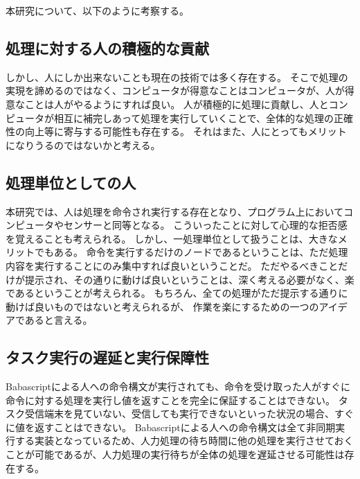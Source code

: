 \documentclass[twoside]{wiss}
\begin{document}
本研究について、以下のように考察する。

\subsection{処理に対する人の積極的な貢献}



しかし、人にしか出来ないことも現在の技術では多く存在する。
そこで処理の実現を諦めるのではなく、コンピュータが得意なことはコンピュータが、人が得意なことは人がやるようにすれば良い。
人が積極的に処理に貢献し、人とコンピュータが相互に補完しあって処理を実行していくことで、全体的な処理の正確性の向上等に寄与する可能性も存在する。
それはまた、人にとってもメリットになりうるのではないかと考える。

\subsection{処理単位としての人}

本研究では、人は処理を命令され実行する存在となり、プログラム上においてコンピュータやセンサーと同等となる。
こういったことに対して心理的な拒否感を覚えることも考えられる。
しかし、一処理単位として扱うことは、大きなメリットでもある。
命令を実行するだけのノードであるということは、ただ処理内容を実行することにのみ集中すれば良いということだ。
ただやるべきことだけが提示され、その通りに動けば良いということは、深く考える必要がなく、楽であるということが考えられる。
もちろん、全ての処理がただ提示する通りに動けば良いものではないと考えられるが、
作業を楽にするための一つのアイデアであると言える。

\subsection{タスク実行の遅延と実行保障性}

Babascriptによる人への命令構文が実行されても、命令を受け取った人がすぐに命令に対する処理を実行し値を返すことを完全に保証することはできない。
タスク受信端末を見ていない、受信しても実行できないといった状況の場合、すぐに値を返すことはできない。
Babascriptによる人への命令構文は全て非同期実行する実装となっているため、人力処理の待ち時間に他の処理を実行させておくことが可能であるが、人力処理の実行待ちが全体の処理を遅延させる可能性は存在する。
\end{document}
